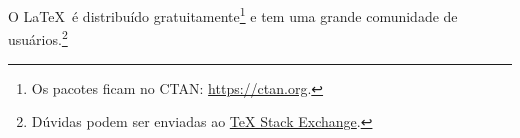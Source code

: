 \documentclass[a4paper]{article}
\begin{document}
O \LaTeX\ é distribuído gratuitamente\footnote{Os pacotes ficam no CTAN:
\url{https://ctan.org}.}
e tem uma grande comunidade de usuários.\footnote{Dúvidas podem ser enviadas
ao \href{https://tex.stackexchange.com}{TeX Stack Exchange}.}
\end{document}
